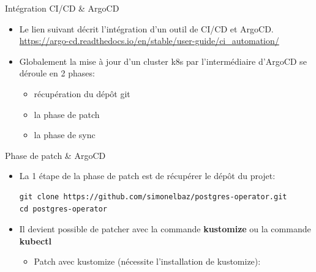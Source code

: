 
\begin{frame}[fragile]{Intégration CI/CD \& ArgoCD}

\begin{itemize}
   \item Le lien suivant décrit l'intégration d'un outil de CI/CD et ArgoCD. \url{https://argo-cd.readthedocs.io/en/stable/user-guide/ci_automation/}
   \item Globalement la mise à jour d'un cluster k8s par l'intermédiaire d'ArgoCD se déroule en 2 phases:
   \begin{itemize}
      \item récupération du dépôt git
      \item la phase de patch
      \item la phase de sync
   \end{itemize}
\end{itemize}

\end{frame}


\begin{frame}[fragile]{Phase de patch \& ArgoCD}

\begin{itemize}
   \item La 1\iere{} étape de la phase de patch est de récupérer le dépôt du projet:
\begin{tiny}
\begin{Verbatim}[commandchars=\&\@\@]
git clone https://github.com/simonelbaz/postgres-operator.git
cd postgres-operator
\end{Verbatim}
\end{tiny}
   \item Il devient possible de patcher avec la commande \textbf{kustomize} ou la commande \textbf{kubectl}
   \begin{itemize}
         \item Patch avec kustomize (nécessite l'installation de kustomize):
   \end{itemize}
\end{itemize}

\end{frame}


